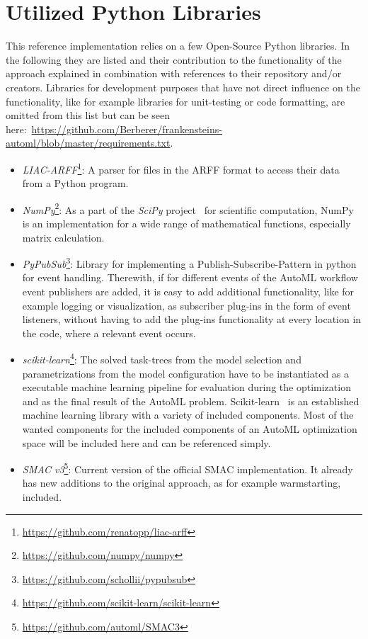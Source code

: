 \section{Utilized Python Libraries}
\label{sec:implementation:libraries}
This reference implementation relies on a few Open-Source Python libraries.
In the following they are listed and their contribution to the functionality of the approach explained in combination with references to their repository and/or creators.
Libraries for development purposes that have not direct influence on the functionality, like for example libraries for unit-testing or code formatting, are omitted from this list but can be seen here:~\url{https://github.com/Berberer/frankensteins-automl/blob/master/requirements.txt}. 
\begin{itemize}
    \item \textit{LIAC-ARFF}\footnote{\url{https://github.com/renatopp/liac-arff}}: A parser for files in the ARFF format to access their data from a Python program.
    \item \textit{NumPy}\footnote{\url{https://github.com/numpy/numpy}}: As a part of the \textit{SciPy} project~\cite{Virtanen-SciPy} for scientific computation, NumPy is an implementation for a wide range of mathematical functions, especially matrix calculation.
    \item \textit{PyPubSub}\footnote{\url{https://github.com/schollii/pypubsub}}: Library for implementing a Publish-Subscribe-Pattern in python for event handling.
    Therewith, if for different events of the AutoML workflow event publishers are added, it is easy to add additional functionality, like for example logging or visualization, as subscriber plug-ins in the form of event listeners, without having to add the plug-ins functionality at every location in the code, where a relevant event occurs.
    \item \textit{scikit-learn}\footnote{\url{https://github.com/scikit-learn/scikit-learn}}: The solved task-trees from the model selection and parametrizations from the model configuration have to be instantiated as a executable machine learning pipeline for evaluation during the optimization and as the final result of the AutoML problem.
    Scikit-learn~\cite{Pedregosa-Scikit-learn} is an established machine learning library with a variety of included components.
    Most of the wanted components for the included components of an AutoML optimization space will be included here and can be referenced simply.
    \item \textit{SMAC v3}\footnote{\url{https://github.com/automl/SMAC3}}: Current version of the official SMAC implementation. It already has new additions to the original approach, as for example warmstarting, included.
\end{itemize}

